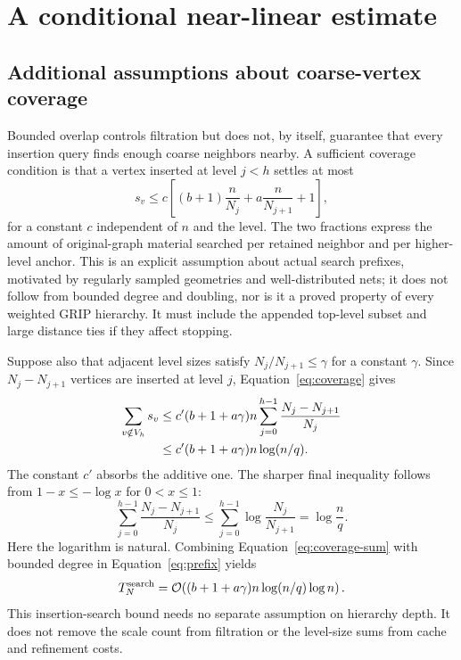 \documentclass[11pt,a4paper]{article}
\newcommand{\bigO}{\mathcal O}
\begin{document}
\section{A conditional near-linear estimate}\label{sec:conditional}

\subsection{Additional assumptions about coarse-vertex coverage}

Bounded overlap controls filtration but does not, by itself, guarantee that
every insertion query finds enough coarse neighbors nearby. A sufficient
coverage condition is that a vertex inserted at level $j<h$ settles at most
\begin{equation}
 s_v\leq c\!\left[
   (b+1)\frac{n}{N_j}
   +a\frac{n}{N_{j+1}}+1\right],
 \label{eq:coverage}
\end{equation}
for a constant $c$ independent of $n$ and the level. The two fractions express
the amount of original-graph material searched per retained neighbor and per
higher-level anchor. This is an explicit assumption about actual search
prefixes, motivated by regularly sampled geometries and well-distributed nets;
it does not follow from bounded degree and doubling, nor is it a proved
property of every weighted GRIP hierarchy. It must include the appended
top-level subset and large distance ties if they affect stopping.

Suppose also that adjacent level sizes satisfy $N_j/N_{j+1}\leq\gamma$ for a
constant $\gamma$. Since $N_j-N_{j+1}$ vertices are inserted at level $j$,
Equation~\eqref{eq:coverage} gives
\begin{align}
 \sum_{v\notin V_h}s_v
 &\leq c' (b+1+a\gamma)n
     \sum_{j=0}^{h-1}\frac{N_j-N_{j+1}}{N_j} \notag\\
 &\leq c'(b+1+a\gamma)n\log(n/q).
 \label{eq:coverage-sum}
\end{align}
The constant $c'$ absorbs the additive one. The sharper final inequality
follows from $1-x\leq-\log x$ for $0<x\leq1$:
\begin{equation}
 \sum_{j=0}^{h-1}\frac{N_j-N_{j+1}}{N_j}
 \leq\sum_{j=0}^{h-1}\log\frac{N_j}{N_{j+1}}
 =\log\frac{n}{q}.
 \label{eq:telescoping}
\end{equation}
Here the logarithm is natural. Combining Equation~\eqref{eq:coverage-sum}
with bounded degree in Equation~\eqref{eq:prefix} yields
\begin{equation}
 T_N^{\rm search}
 =\bigO\!\left((b+1+a\gamma)n\log(n/q)\log n\right).
 \label{eq:insertion-sharp}
\end{equation}
This insertion-search bound needs no separate assumption on hierarchy depth.
It does not remove the scale count from filtration or the level-size sums
from cache and refinement costs.
\end{document}
